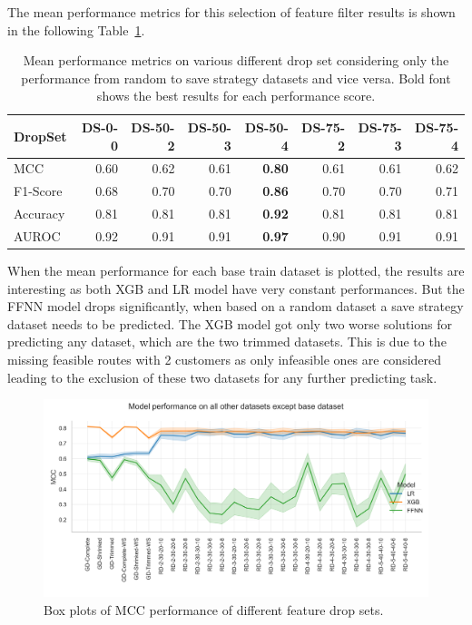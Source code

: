 The mean performance metrics for this selection of feature filter results is shown in the following Table~\ref{tab:featurePerformance_OnlyCrossCorrelation}.

\begin{table}[ht]
    \centering
    \begin{tabular}{lrrrrrrr}
        \toprule
        DropSet  & DS-0-0 & DS-50-2 & DS-50-3 & DS-50-4       & DS-75-2 & DS-75-3 & DS-75-4 \\
        \midrule
        MCC      & 0.60   & 0.62    & 0.61    & \textbf{0.80} & 0.61    & 0.61    & 0.62    \\
        F1-Score & 0.68   & 0.70    & 0.70    & \textbf{0.86} & 0.70    & 0.70    & 0.71    \\
        Accuracy & 0.81   & 0.81    & 0.81    & \textbf{0.92} & 0.81    & 0.81    & 0.81    \\
        AUROC    & 0.92   & 0.91    & 0.91    & \textbf{0.97} & 0.90    & 0.91    & 0.91    \\
        \bottomrule
    \end{tabular}
    \caption[Mean performance metrics on various different drop set considering only the performance from random to save strategy datasets and vice versa.]
    {Mean performance metrics on various different drop set considering only the performance from random to save strategy datasets and vice versa.
        Bold font shows the best results for each performance score.}
    \label{tab:featurePerformance_OnlyCrossCorrelation}
\end{table}

When the mean performance for each base train dataset is plotted, the results are interesting as both XGB and \gls{LR}
model have very constant performances. But the \gls{FFNN} model drops significantly, when based on a random dataset a save strategy dataset
needs to be predicted. The XGB model got only two worse solutions for predicting any dataset, which are the two trimmed datasets. This
is due to the missing feasible routes with 2 customers as only infeasible ones are considered leading to the exclusion of these two
datasets for any further predicting task.

\begin{figure}[ht]
    \centering
    \includegraphics[width = .95\textwidth]{pictures/feature_filter/cross_performance_lineplot.png}
    \caption{Box plots of MCC performance of different feature drop sets.}
    \label{fig:mcc_filter_results_lineplot}
\end{figure}

